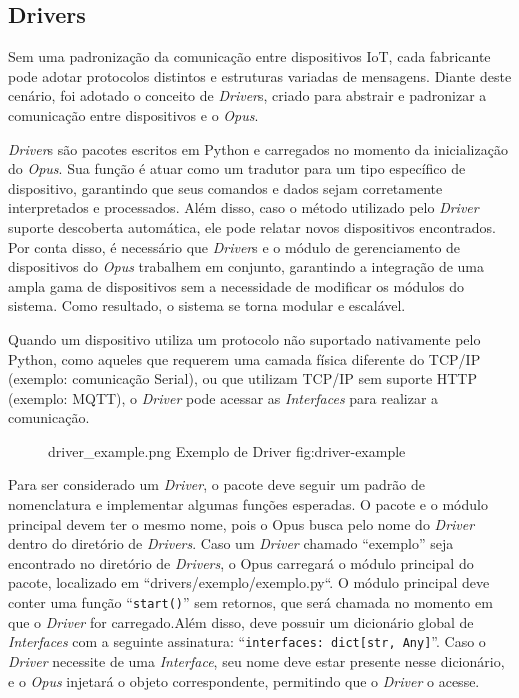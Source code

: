 \subsection{\textbf{Drivers}}

Sem uma padronização da comunicação entre dispositivos IoT, cada fabricante pode adotar protocolos distintos e estruturas variadas de 
mensagens. Diante deste cenário, foi adotado o conceito de \emph{Driver}s, criado para abstrair e padronizar a comunicação entre 
dispositivos e o \emph{Opus}.

\emph{Driver}s são pacotes escritos em Python e carregados no momento da inicialização do \emph{Opus}.
Sua função é atuar como um tradutor para um tipo específico de dispositivo, garantindo que seus comandos e dados sejam corretamente 
interpretados e processados. Além disso, caso o método utilizado pelo \emph{Driver} suporte descoberta automática, ele pode relatar novos 
dispositivos encontrados. Por conta disso, é necessário que \emph{Driver}s e o módulo de gerenciamento de dispositivos do \emph{Opus} trabalhem 
em conjunto, garantindo a integração de uma ampla gama de dispositivos sem a necessidade de modificar os módulos do sistema.
Como resultado, o sistema se torna modular e escalável.

Quando um dispositivo utiliza um protocolo não suportado nativamente pelo Python, como aqueles que requerem uma camada física diferente do TCP/IP 
(exemplo: comunicação Serial), ou que utilizam TCP/IP sem suporte HTTP (exemplo: MQTT), o \emph{Driver} pode acessar as 
\emph{Interfaces} para realizar a comunicação.

\begin{figure}[H]
    {driver_example.png}
    {Exemplo de Driver}
    {fig:driver-example}
\end{figure}

Para ser considerado um \emph{Driver}, o pacote deve seguir um padrão de nomenclatura e implementar algumas funções esperadas.
O pacote e o módulo principal devem ter o mesmo nome, pois o Opus busca pelo nome do \emph{Driver} dentro do diretório de \emph{Drivers}.
Caso um \emph{Driver} chamado ``exemplo'' seja encontrado no diretório de \emph{Drivers}, o Opus carregará o módulo principal do pacote, localizado em 
``drivers/exemplo/exemplo.py``. O módulo principal deve conter uma função ``\lstinline{start()}'' sem retornos, que será chamada no momento em que o 
\emph{Driver} for carregado.Além disso, deve possuir um dicionário global de \emph{Interfaces} com a seguinte assinatura: 
``\lstinline{interfaces: dict[str, Any]}''. Caso o \emph{Driver} necessite de uma \emph{Interface}, seu nome deve estar presente nesse dicionário,
e o \emph{Opus} injetará o objeto correspondente, permitindo que o \emph{Driver} o acesse.

